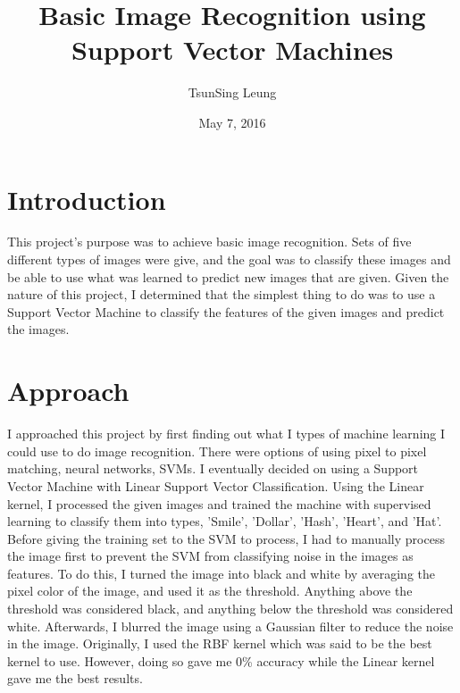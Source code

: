 \documentclass{article}
\title{Basic Image Recognition using Support Vector Machines}
\author{TsunSing Leung}
\date{May 7, 2016}
\begin{document}
\maketitle

\section{Introduction}
This project's purpose was to achieve basic image recognition. Sets of five different types of images were give, and the goal was to classify these images and be able to use what was learned to predict new images that are given. Given the nature of this project, I determined that the simplest thing to do was to use a Support Vector Machine to classify the features of the given images and predict the images.

\section{Approach}
I approached this project by first finding out what I types of machine learning I could use to do image recognition. There were options of using pixel to pixel matching, neural networks, SVMs. I eventually decided on using a Support Vector Machine with Linear Support Vector Classification. Using the Linear kernel, I processed the given images and trained the machine with supervised learning to classify them into types, 'Smile', 'Dollar', 'Hash', 'Heart', and 'Hat'. Before giving the training set to the SVM to process, I had to manually process the image first to prevent the SVM from classifying noise in the images as features. To do this, I turned the image into black and white by averaging the pixel color of the image, and used it as the threshold. Anything above the threshold was considered black, and anything below the threshold was considered white. Afterwards, I blurred the image using a Gaussian filter to reduce the noise in the image. Originally, I used the RBF kernel which was said to be the best kernel to use. However, doing so gave me 0\% accuracy while the Linear kernel gave me the best results. 
\pagebreak
\end{document}
